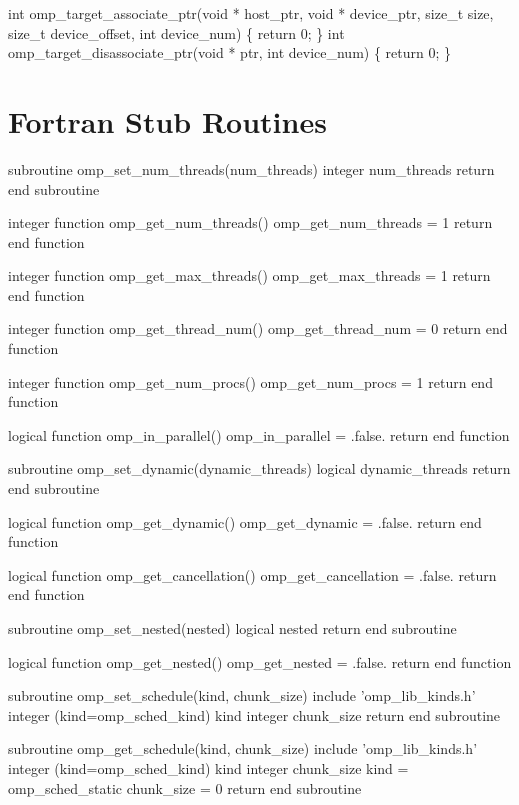 {\begin{codepar}
int omp_target_associate_ptr(void * host_ptr, void * device_ptr,
                             size_t size, size_t device_offset,
                             int device_num)
\{
    return 0;
\}
int omp_target_disassociate_ptr(void * ptr, int device_num)
\{
    return 0;
\}

\end{codepar}} %








\pagebreak
\section{Fortran Stub Routines}
\label{sec:Fortran Stub Routines}
{\small \begin{codepar}
subroutine omp\_set\_num\_threads(num\_threads)
  integer num\_threads
  return
end subroutine

integer function omp\_get\_num\_threads()
  omp\_get\_num\_threads = 1
  return
end function

integer function omp\_get\_max\_threads()
  omp\_get\_max\_threads = 1
  return
end function

integer function omp\_get\_thread\_num()
  omp\_get\_thread\_num = 0
  return
end function

integer function omp\_get\_num\_procs()
  omp\_get\_num\_procs = 1
  return
end function

logical function omp\_in\_parallel()
  omp\_in\_parallel = .false.
  return
end function

subroutine omp\_set\_dynamic(dynamic\_threads)
  logical dynamic\_threads
  return
end subroutine

logical function omp\_get\_dynamic()
  omp\_get\_dynamic = .false.
  return
end function

logical function omp\_get\_cancellation()
  omp\_get\_cancellation = .false.
  return
end function

subroutine omp\_set\_nested(nested)
  logical nested
  return
end subroutine

logical function omp\_get\_nested()
  omp\_get\_nested = .false.
  return
end function

subroutine omp\_set\_schedule(kind, chunk\_size)
  include 'omp\_lib\_kinds.h'
  integer (kind=omp\_sched\_kind) kind
  integer chunk\_size
  return
end subroutine

subroutine omp\_get\_schedule(kind, chunk\_size)
  include 'omp\_lib\_kinds.h'
  integer (kind=omp\_sched\_kind) kind
  integer chunk\_size
  kind = omp\_sched\_static
  chunk\_size = 0
  return
end subroutine


\end{codepar}}
